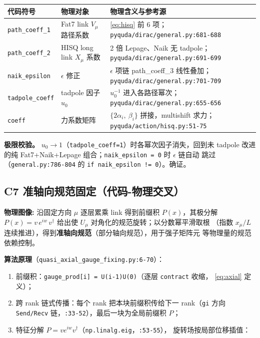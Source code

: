 \documentclass[UTF8]{ctexart}
\begin{document}
\begin{xltabular}{\textwidth}{llX}
\toprule
\textcolor{map}{代码符号} & 物理对象 & 物理含义与参考源 \\
\midrule
\endhead
\texttt{path\_coeff\_1} & Fat7 link $V_\mu$ 路径系数 & \eqref{eq:hisq} 前 6 项；\texttt{\nolinkurl{pyquda/dirac/general.py:681-688}} \\
\texttt{path\_coeff\_2} & HISQ long link $X_\mu$ 系数 & 2 倍 Lepage、Naik 无 tadpole；\texttt{\nolinkurl{pyquda/dirac/general.py:691-699}} \\
\texttt{naik\_epsilon} & $\epsilon$ 修正 & $\epsilon$ 项链 path\_coeff\_3 线性叠加；\texttt{\nolinkurl{pyquda/dirac/general.py:701-709}} \\
\texttt{tadpole\_coeff} & tadpole 因子 $u_0$ & $u_0^{-1}$ 进入各路径幂次；\texttt{\nolinkurl{pyquda/dirac/general.py:655-656}} \\
\texttt{coeff} & 力系数矩阵 & $\{2\alpha_i,\ \beta_i\}$ 拼接，multishift 求力；\texttt{\nolinkurl{pyquda/action/hisq.py:51-75}} \\
\bottomrule
\end{xltabular}

\textbf{极限校验。} $u_0 \to 1$（\texttt{tadpole\_coeff=1}）时各幂次因子消失，回到未
tadpole 改进的纯 Fat7+Naik+Lepage 组合；\texttt{naik\_epsilon = 0} 时 $\epsilon$ 链自动
跳过（\texttt{general.py:786-804} 的 \texttt{if naik\_epsilon != 0}）。\textcolor{accent}{确证}。

\subsection{C7 准轴向规范固定（代码-物理交叉）}

\begin{physbox}
\textbf{物理图像:} 沿固定方向 $\mu$ 逐层累乘 link 得到前缀积 $P(x)$，其极分解
$P(x) = v\,e^{i w}\,v^\dagger$ 给出使 $U_\mu$ 对角化的规范旋转；以分数幂平滑取根
（指数 $x_\mu/L$ 连续推进），得到\textbf{准轴向规范}（部分轴向规范），用于强子矩阵元
等物理量的规范依赖控制。
\end{physbox}

\textbf{算法原理}（\texttt{quasi\_axial\_gauge\_fixing.py:6-70}）：

\begin{enumerate}
\item 前缀积：\texttt{gauge\_prod[i] = U(i-1)\cdots U(0)}（逐层 \texttt{contract} 收缩，
\eqref{eq:axial} 定义）；
\item 跨 rank 链式传播：每个 rank 把本块前缀积传给下一 rank（\texttt{gi} 方向
\texttt{Send/Recv} 链，\texttt{:33-52}），最后一块为全局前缀积 $P$；
\item 特征分解 $P = v e^{iw} v^\dagger$（\texttt{np.linalg.eig}，\texttt{:53-55}），
旋转场按局部位移插值：
\end{enumerate}
\end{document}
